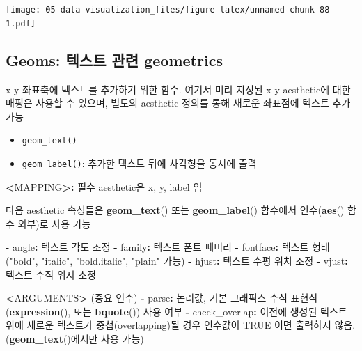 \documentclass[
  11pt,
]{krantz}
\newenvironment{Shaded}{\begin{snugshade}}{\end{snugshade}}
\newcommand{\ErrorTok}[1]{\textcolor[rgb]{0.14,0.14,0.14}{\textbf{#1}}}
\newcommand{\KeywordTok}[1]{\textcolor[rgb]{0.27,0.27,0.27}{\textbf{#1}}}
\newcommand{\NormalTok}[1]{#1}
\newcommand{\OperatorTok}[1]{\textcolor[rgb]{0.43,0.43,0.43}{\textbf{#1}}}
\newcommand{\OtherTok}[1]{\textcolor[rgb]{0.37,0.37,0.37}{#1}}
\newcommand{\StringTok}[1]{\textcolor[rgb]{0.5,0.5,0.5}{#1}}
\providecommand{\tightlist}{%
  \setlength{\itemsep}{0pt}\setlength{\parskip}{0pt}}
\begin{document}
\texttt{[image: 05-data-visualization\_files/figure-latex/unnamed-chunk-88-1.pdf]}

\normalsize

\hypertarget{geom-texts}{%
\subsection{Geoms: 텍스트 관련 geometrics}\label{geom-texts}}

x-y 좌표축에 텍스트를 추가하기 위한 함수. 여기서 미리 지정된 x-y aesthetic에 대한 매핑은 사용할 수 있으며, 별도의 aesthetic 정의를 통해 새로운 좌표점에 텍스트 추가 가능

\begin{itemize}
\tightlist
\item
  \texttt{geom\_text()}
\item
  \texttt{geom\_label()}: 추가한 텍스트 뒤에 사각형을 동시에 출력
\end{itemize}

\footnotesize

\begin{Shaded}
\begin{Highlighting}[]
\OperatorTok{<}\NormalTok{MAPPING}\OperatorTok{>}\ErrorTok{:}\StringTok{ }\NormalTok{필수 aesthetic은 x, y, label 임}

\NormalTok{다음 aesthetic 속성들은 }\KeywordTok{geom_text}\NormalTok{() 또는 }\KeywordTok{geom_label}\NormalTok{() }
\NormalTok{함수에서 인수(}\KeywordTok{aes}\NormalTok{() 함수 외부)로 사용 가능}

\OperatorTok{-}\StringTok{ }\NormalTok{angle}\OperatorTok{:}\StringTok{ }\NormalTok{텍스트 각도 조정}
\OperatorTok{-}\StringTok{ }\NormalTok{family}\OperatorTok{:}\StringTok{ }\NormalTok{텍스트 폰트 페미리}
\OperatorTok{-}\StringTok{ }\NormalTok{fontface}\OperatorTok{:}\StringTok{ }\NormalTok{텍스트 형태(}\StringTok{"bold"}\NormalTok{, }\StringTok{"italic"}\NormalTok{, }\StringTok{"bold.italic"}\NormalTok{, }\StringTok{"plain"}\NormalTok{ 가능)}
\OperatorTok{-}\StringTok{ }\NormalTok{hjust}\OperatorTok{:}\StringTok{ }\NormalTok{텍스트 수평 위치 조정}
\OperatorTok{-}\StringTok{ }\NormalTok{vjust}\OperatorTok{:}\StringTok{ }\NormalTok{텍스트 수직 위지 초정}

\OperatorTok{<}\NormalTok{ARGUMENTS}\OperatorTok{>}\StringTok{ }\NormalTok{(중요 인수)}
  \OperatorTok{-}\StringTok{ }\NormalTok{parse}\OperatorTok{:}\StringTok{ }\NormalTok{논리값, 기본 그래픽스 수식 표현식(}\KeywordTok{expression}\NormalTok{(), 또는 }\KeywordTok{bquote}\NormalTok{()) 사용 여부}
  \OperatorTok{-}\StringTok{ }\NormalTok{check_overlap}\OperatorTok{:}\StringTok{ }\NormalTok{이전에 생성된 텍스트 위에 새로운 텍스트가 중첩(overlapping)될 경우}
\NormalTok{                   인수값이 }\OtherTok{TRUE}\NormalTok{ 이면 출력하지 않음. (}\KeywordTok{geom_text}\NormalTok{()에서만 사용 가능)}
\end{Highlighting}
\end{Shaded}
\end{document}
